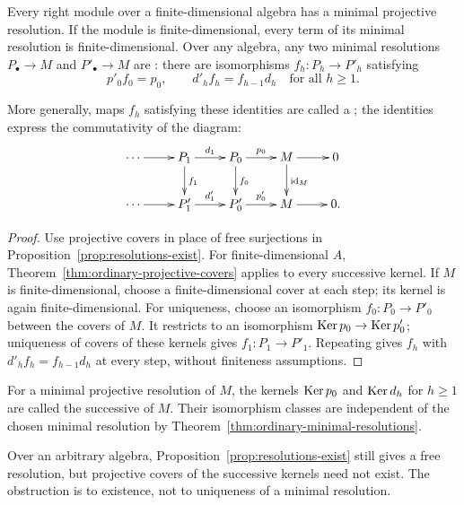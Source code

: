 \begin{theorem}\label{thm:ordinary-minimal-resolutions}
Every right module over a finite-dimensional algebra has a minimal projective resolution.
If the module is finite-dimensional, every term of its minimal resolution is finite-dimensional.
Over any algebra, any two minimal resolutions $P_\bullet\to M$ and $P'_\bullet\to M$ are : there are isomorphisms $f_h:P_h\to P'_h$ satisfying
\[
p'_0f_0=p_0,\qquad
d'_h f_h=f_{h-1}d_h\quad\text{for all }h\geq1.
\]
\end{theorem}

More generally, maps $f_h$ satisfying these identities are called a ; the identities express the commutativity of the diagram:
\[
\xymatrix@C=24pt@R=22pt{
\cdots\ar[r] & P_1\ar[r]^{d_1}\ar[d]^{f_1}
& P_0\ar[r]^{p_0}\ar[d]^{f_0} & M\ar[r]\ar[d]^{\id_M} & 0\\
\cdots\ar[r] & P'_1\ar[r]^{d'_1}
& P'_0\ar[r]^{p'_0} & M\ar[r] & 0.
}
\]

\begin{proof}
Use projective covers in place of free surjections in Proposition~\ref{prop:resolutions-exist}.
For finite-dimensional $A$, Theorem~\ref{thm:ordinary-projective-covers} applies to every successive kernel.
If $M$ is finite-dimensional, choose a finite-dimensional cover at each step; its kernel is again finite-dimensional.
For uniqueness, choose an isomorphism $f_0:P_0\to P'_0$ between the covers of $M$.
It restricts to an isomorphism $\operatorname{Ker}\nolimits p_0\to\operatorname{Ker}\nolimits p'_0$; uniqueness of covers of these kernels gives $f_1:P_1\to P'_1$.
Repeating gives $f_h$ with $d'_h f_h=f_{h-1}d_h$ at every step, without finiteness assumptions.
\end{proof}

\begin{remark}
For a minimal projective resolution of $M$, the kernels $\operatorname{Ker}\nolimits p_0$ and $\operatorname{Ker}\nolimits d_h$ for $h\geq1$ are called the successive  of $M$.
Their isomorphism classes are independent of the chosen minimal resolution by Theorem~\ref{thm:ordinary-minimal-resolutions}.
\end{remark}

\begin{remark}
Over an arbitrary algebra, Proposition~\ref{prop:resolutions-exist} still gives a free resolution, but projective covers of the successive kernels need not exist.
The obstruction is to existence, not to uniqueness of a minimal resolution.
\end{remark}

